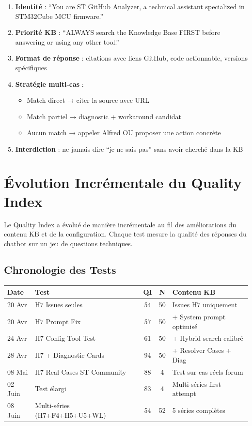 \documentclass[12pt,a4paper]{report}
\begin{document}
\begin{enumerate}
  \item \textbf{Identité} : ``You are ST GitHub Analyzer, a technical assistant specialized in STM32Cube MCU firmware.''
  \item \textbf{Priorité KB} : ``ALWAYS search the Knowledge Base FIRST before answering or using any other tool.''
  \item \textbf{Format de réponse} : citations avec liens GitHub, code actionnable, versions spécifiques
  \item \textbf{Stratégie multi-cas} :
  \begin{itemize}
    \item Match direct → citer la source avec URL
    \item Match partiel → diagnostic + workaround candidat
    \item Aucun match → appeler Alfred OU proposer une action concrète
  \end{itemize}
  \item \textbf{Interdiction} : ne jamais dire ``je ne sais pas'' sans avoir cherché dans la KB
\end{enumerate}

\section{Évolution Incrémentale du Quality Index}

Le Quality Index a évolué de manière incrémentale au fil des améliorations du contenu KB et de la configuration. Chaque test mesure la qualité des réponses du chatbot sur un jeu de questions techniques.

\subsection{Chronologie des Tests}

\begin{longtable}{p{2cm}p{5cm}ccp{3.5cm}}
\toprule
\textbf{Date} & \textbf{Test} & \textbf{QI} & \textbf{N} & \textbf{Contenu KB} \\
\midrule
20 Avr & H7 Issues seules & 54 & 50 & Issues H7 uniquement \\
20 Avr & H7 Prompt Fix & 57 & 50 & + System prompt optimisé \\
24 Avr & H7 Config Tool Test & 61 & 50 & + Hybrid search calibré \\
28 Avr & H7 + Diagnostic Cards & 94 & 50 & + Resolver Cases + Diag \\
08 Mai & H7 Real Cases ST Community & 88 & 4 & Test sur cas réels forum \\
02 Juin & Test élargi & 83 & 4 & Multi-séries first attempt \\
08 Juin & Multi-séries (H7+F4+H5+U5+WL) & 54 & 52 & 5 séries complètes \\
\bottomrule
\end{longtable}
\end{document}
